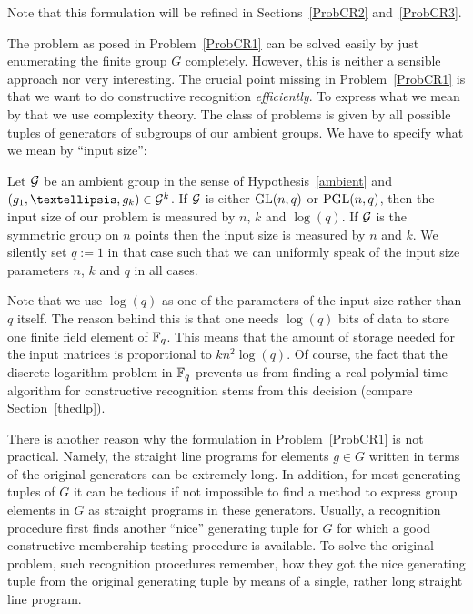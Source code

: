 Note that this formulation will be refined in Sections~\ref{ProbCR2} 
and~\ref{ProbCR3}.

\smallskip
The problem as posed in Problem~\ref{ProbCR1} can be solved easily by just
enumerating the finite group $G$ completely. However, this is neither
a sensible approach nor very interesting. The crucial point missing
in Problem~\ref{ProbCR1} is that we want to do constructive recognition
\emph{efficiently}. To express what we mean by that we use complexity
theory. The class of problems is given by all possible tuples of
generators of subgroups of our ambient groups. We have to specify
what we mean by ``input size'':

\begin{Def}
\label{inputsize}
Let $\mathcal{G}$ be an ambient group in the sense of Hypothesis~\ref{ambient}
and $(g_1, \ldots, g_k) \in \GG^k$. If $\mathcal{G}$ is either $\GL(n,q)$ or
$\PGL(n,q)$, then the input size of our problem is measured by $n$, $k$
and $\log(q)$. If $\mathcal{G}$ is the symmetric group on $n$ points then the
input size is measured by $n$ and $k$. We silently set $q := 1$ in that
case such that we can uniformly speak of the input size parameters $n$, $k$
and $q$ in all cases.
\end{Def}

\begin{Rem}
Note that we use $\log(q)$ as one of the parameters of the input size
rather than $q$ itself. The reason behind this is that one needs
$\log(q)$ bits of data to store one finite field element of $\mathbb{F}_q$.
This means that the amount of storage needed for the input matrices is
proportional to $kn^2\log(q)$. Of course, the fact that the discrete
logarithm problem in $\mathbb{F}_q$ prevents us from finding a real polymial
time algorithm for constructive recognition stems from this decision
(compare Section~\ref{thedlp}).
\proofend
\end{Rem}

There is another reason why the formulation in Problem~\ref{ProbCR1} is not
practical. Namely, the straight line programs for elements $g \in G$
written in terms of the original generators can be extremely long. In
addition, for most generating tuples of $G$ it can be tedious if not
impossible to find a method to express group elements in $G$ as straight
programs in these generators. Usually, a recognition procedure first finds
another ``nice'' generating tuple for $G$ for which a good constructive
membership testing procedure is available. To solve the original problem,
such recognition procedures remember, how they got the nice generating
tuple from the original generating tuple by means of a single, rather long
straight line program.

